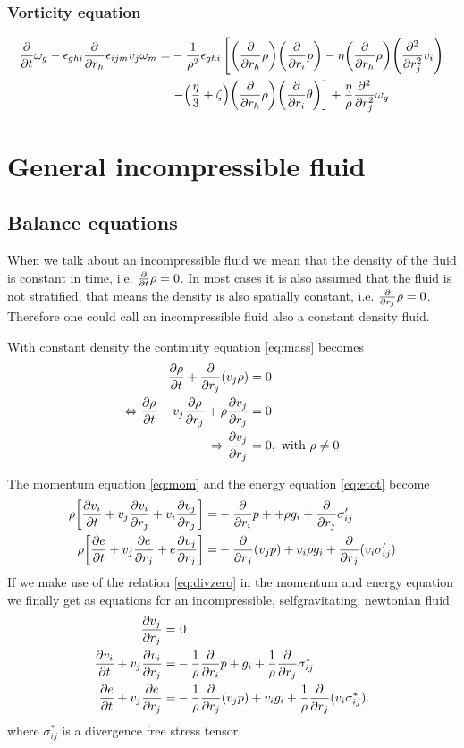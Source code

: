 \subsubsection*{Vorticity equation}
\begin{align}
\begin{split}
\pd{t}\omega_g
-\epsilon_{ghi}\pd{r_h} \epsilon_{ijm} v_j \omega_m =
&-\frac{1}{\rho^2}\epsilon_{ghi}\left[
\lra{\pd{r_h}\rho} \lra{\pd{r_i}p}
-\eta \lra{\pd{r_h}\rho} \lra{\pdd{r_j}v_i}\right.\\
&\left.-\lra{\frac{\eta}{3}+\zeta} \lra{\pd{r_h}\rho} 
\lra{\pd{r_i}\theta} \right]
+\frac{\eta}{\rho}\pdd{r_j}\omega_g
\end{split}
\end{align}

\section{General incompressible fluid}
\subsection{Balance equations}
When we talk about an incompressible fluid we mean that the density of the fluid
is constant in time, i.e. $\pd{t}\rho=0$. In most cases it is also assumed that 
the fluid is not stratified, that means the density is also spatially constant,
i.e. $\pd{r_j}\rho=0$. Therefore one could call an incompressible fluid also a
constant density fluid.

With constant density the continuity equation \eqref{eq:mass} becomes
\begin{align}
\ppd{t}{\rho} + \pd{r_j}(v_j \rho) &= 0 \\
\Leftrightarrow \ppd{t}{\rho}+ v_j \ppd{r_j}{\rho} + \rho \ppd{r_j}{v_j} &= 0\\
\Rightarrow \ppd{r_j}{v_j} &= 0,\ \text{with $\rho\neq 0$} \label{eq:divzero}
\end{align}

The momentum equation \eqref{eq:mom} and the energy equation
\eqref{eq:etot} 
become
\begin{align}
\rho \lrb{\ppd{t}{v_i} + v_j \ppd{r_j}{v_i} + v_i \ppd{r_j}{v_j}}  
=& -\pd{r_i}p + +\rho g_i+ \pd{r_j}\sigma'_{ij} \\
\rho \lrb{\ppd{t}{e} + v_j \ppd{r_j}{e} + e \ppd{r_j}{v_j}} 
=& -\pd{r_j}(v_j p) + v_i \rho g_i +\pd{r_j}(v_i \sigma'_{ij})
\end{align}
If we make use of the relation \eqref{eq:divzero} in the momentum and energy 
equation we finally get as equations for an incompressible, selfgravitating, 
newtonian fluid
\begin{align}
\ppd{r_j}{v_j} =&\ 0\\
\ppd{t}{v_i} + v_j \ppd{r_j}{v_i} =& -\frac{1}{\rho}\pd{r_i}p + g_i
+\frac{1}{\rho}\pd{r_j}\sigma^*_{ij}\\
\ppd{t}{e} + v_j \ppd{r_j}{e} =& -\frac{1}{\rho} \pd{r_j}(v_j p) + v_i g_i
+\frac{1}{\rho}\pd{r_j}(v_i \sigma^*_{ij}).
\end{align}
where $\sigma^*_{ij}$ is a divergence free stress tensor.


